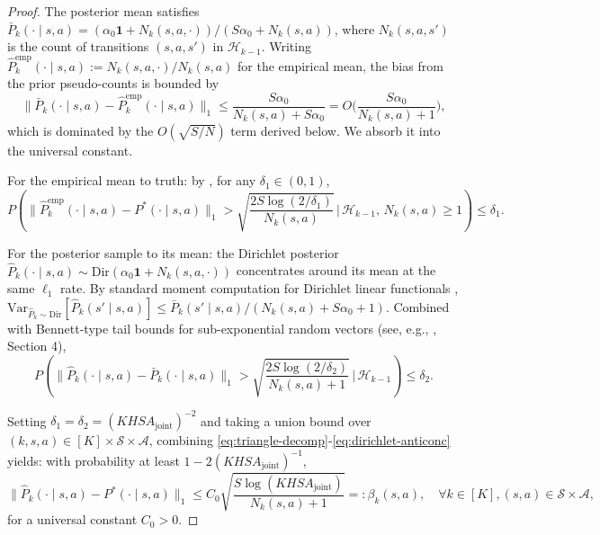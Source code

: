 \documentclass{article}
\begin{document}
\begin{proof}
The posterior mean satisfies $\bar{P}_k(\cdot \mid s, a) = (\alpha_0 \mathbf{1} + N_k(s, a, \cdot))/(S\alpha_0 + N_k(s, a))$, where $N_k(s, a, s')$ is the count of transitions $(s, a, s')$ in $\mathcal{H}_{k-1}$. Writing $\hat{P}^{\mathrm{emp}}_k(\cdot \mid s, a) := N_k(s, a, \cdot)/N_k(s, a)$ for the empirical mean, the bias from the prior pseudo-counts is bounded by
\begin{equation}
\label{eq:prior-bias}
\|\bar{P}_k(\cdot \mid s, a) - \hat{P}^{\mathrm{emp}}_k(\cdot \mid s, a)\|_1 \leq \frac{S \alpha_0}{N_k(s, a) + S\alpha_0} = O\Big(\frac{S\alpha_0}{N_k(s, a) + 1}\Big),
\end{equation}
which is dominated by the $O(\sqrt{S/N})$ term derived below. We absorb it into the universal constant.

For the empirical mean to truth: by \citet{weissman2003inequalities}, for any $\delta_1 \in (0, 1)$,
\begin{equation}
\label{eq:weissman}
P\left(\|\hat{P}^{\mathrm{emp}}_k(\cdot \mid s, a) - P^*(\cdot \mid s, a)\|_1 > \sqrt{\frac{2 S \log(2/\delta_1)}{N_k(s, a)}}\,\Big|\,\mathcal{H}_{k-1},\, N_k(s, a) \geq 1\right) \leq \delta_1.
\end{equation}

For the posterior sample to its mean: the Dirichlet posterior $\hat{P}_k(\cdot \mid s, a) \sim \mathrm{Dir}(\alpha_0 \mathbf{1} + N_k(s, a, \cdot))$ concentrates around its mean at the same $\ell_1$ rate. By standard moment computation for Dirichlet linear functionals \citep[Section 36.2]{lattimore2020bandit}, $\mathrm{Var}_{\hat{P}_k \sim \mathrm{Dir}}[\hat{P}_k(s' \mid s, a)] \leq \bar{P}_k(s' \mid s, a)/(N_k(s, a) + S\alpha_0 + 1)$. Combined with Bennett-type tail bounds for sub-exponential random vectors (see, e.g., \citealp{russo2014learning}, Section 4),
\begin{equation}
\label{eq:dirichlet-anticonc}
P\left(\|\hat{P}_k(\cdot \mid s, a) - \bar{P}_k(\cdot \mid s, a)\|_1 > \sqrt{\frac{2 S \log(2/\delta_2)}{N_k(s, a) + 1}}\,\Big|\,\mathcal{H}_{k-1}\right) \leq \delta_2.
\end{equation}

Setting $\delta_1 = \delta_2 = (KH SA_{\mathrm{joint}})^{-2}$ and taking a union bound over $(k, s, a) \in [K] \times \mathcal{S} \times \mathcal{A}$, combining \eqref{eq:triangle-decomp}-\eqref{eq:dirichlet-anticonc} yields: with probability at least $1 - 2 (KH SA_{\mathrm{joint}})^{-1}$,
\begin{equation}
\label{eq:trans-concentration-uniform}
\|\hat{P}_k(\cdot \mid s, a) - P^*(\cdot \mid s, a)\|_1 \leq C_0 \sqrt{\frac{S \log(KH SA_{\mathrm{joint}})}{N_k(s, a) + 1}} =: \beta_k(s, a), \quad \forall k \in [K], (s, a) \in \mathcal{S} \times \mathcal{A},
\end{equation}
for a universal constant $C_0 > 0$.


\end{proof}
\end{document}
